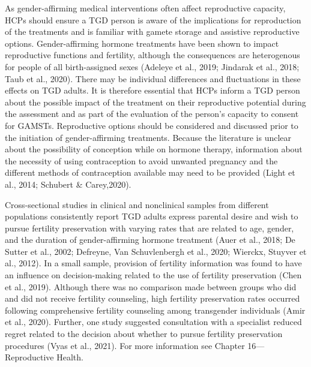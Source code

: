 \documentclass[
]{book}
\begin{document}
As gender-affirming medical interventions
often affect reproductive capacity, HCPs should
ensure a TGD person is aware of the implications
for reproduction of the treatments and is familiar
with gamete storage and assistive reproductive
options. Gender-affirming hormone treatments
have been shown to impact reproductive functions and fertility, although the consequences are
heterogenous for people of all birth-assigned
sexes (Adeleye et al., 2019; Jindarak et al., 2018;
Taub et al., 2020). There may be individual differences and fluctuations in these effects on TGD
adults. It is therefore essential that HCPs inform
a TGD person about the possible impact of the
treatment on their reproductive potential during
the assessment and as part of the evaluation of
the person's capacity to consent for GAMSTs.
Reproductive options should be considered and
discussed prior to the initiation of gender-affirming
treatments. Because the literature is unclear about
the possibility of conception while on hormone
therapy, information about the necessity of using
contraception to avoid unwanted pregnancy and
the different methods of contraception available
may need to be provided (Light et al., 2014;
Schubert \& Carey,2020).

Cross-sectional studies in clinical and nonclinical samples from different populations consistently report TGD adults express parental desire
and wish to pursue fertility preservation with
varying rates that are related to age, gender, and
the duration of gender-affirming hormone treatment (Auer et al., 2018; De Sutter et al., 2002;
Defreyne, Van Schuvlenbergh et al., 2020;
Wierckx, Stuyver et al., 2012). In a small sample,
provision of fertility information was found to
have an influence on decision-making related to
the use of fertility preservation (Chen et al.,
2019). Although there was no comparison made
between groups who did and did not receive fertility counseling, high fertility preservation rates
occurred following comprehensive fertility counseling among transgender individuals (Amir
et al., 2020). Further, one study suggested consultation with a specialist reduced regret related
to the decision about whether to pursue fertility
preservation procedures (Vyas et al., 2021). For
more information see Chapter 16---
Reproductive Health.
\end{document}
